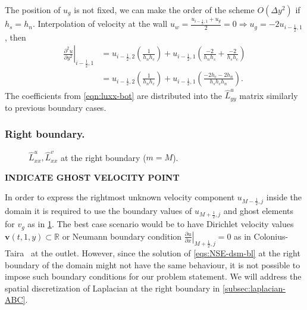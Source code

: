 \documentclass{article}
\numberwithin{equation}{section}
\begin{document}
The position of $u_g$ is not fixed, we can make the order of the scheme $O(\Delta y^2)$ if $h_s=h_n$. Interpolation of velocity at the wall $u_{w} =\frac{u_{i-\frac{1}{2},1}+u_g}{2}=0 \Rightarrow u_g=-2 u_{i-\frac{1}{2},1}$, then
\begin{equation}\label{eqn:luxx-bot}
\begin{aligned}
\left.\frac{\partial^2 u}{\partial y^2}\right|_{i-\frac{1}{2},1} 
& =u_{i-\frac{1}{2},2}\left(\frac{1}{h_n h_c}\right)+u_{i-\frac{1}{2},1}\left(\frac{-2}{h_n h_s}+\frac{-2}{h_s h_c}\right) \\
& =u_{i-\frac{1}{2},2}\left(\frac{1}{h_n h_c}\right)+u_{i-\frac{1}{2},1}\left(\frac{-2 h_c-2 h_n}{h_s h_c h_n}\right).
\end{aligned}
\end{equation}
The coefficients from \cref{eqn:luxx-bot} are distributed into the $\hat{L}^u_{yy}$ matrix similarly to previous boundary cases.


\subsubsection{Right boundary.}\label{subsubsec:laplacian-right}
\begin{figure}[H] %
  \caption{$\hat{L}^u_{xx},\hat{L}^v_{xx}$ at the right boundary ($m=M$).}\label{fig:luxx-right-first}
\end{figure}
\textbf{INDICATE GHOST VELOCITY POINT}

In order to express the rightmost unknown velocity component $u_{M-\frac{1}{2},j}$ inside the domain it is required to use the boundary values of $u_{M+\frac{1}{2},j}$ and ghost elements for $v_g$ as in \cref{fig:luxx-right-first}. The best case scenario would be to have Dirichlet velocity values $\boldsymbol{v}(t,1,y)\subset \mathbb{R}$ or Neumann boundary condition $\left.\frac{\partial u}{\partial x}\right|_{M+\frac{1}{2},j}=0$ as in Colonius-Taira~\cite{Colonius:2008} at the outlet. However, since the solution of \cref{eqs:NSE-dsm-bl} at the right boundary of the domain might not have the same behaviour, it is not possible to impose such boundary conditions for our problem statement. We will address the spatial discretization of Laplacian at the right boundary in \cref{subsec:laplacian-ABC}.
\end{document}
